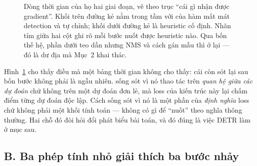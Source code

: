 \documentclass[../../../deep_learning.tex]{subfiles}
\begin{document}
\begin{figure}[H]
{}
\caption{Dòng thời gian của họ hai giai đoạn, vẽ theo trục ``cái gì nhận được gradient''. Khối trên đường kẻ nằm trong tầm với của hàm mất mát detection và tự chỉnh; khối dưới đường kẻ là heuristic cố định. Nhãn tím giữa hai cột ghi rõ mỗi bước nuốt được heuristic nào. Qua bốn thế hệ, phần dưới teo dần nhưng NMS và cách gán mẫu thì ở lại --- đó là dư địa mà Mục~2 khai thác.}
\label{fig:nuot-heuristic}
\end{figure}

Hình~\ref{fig:nuot-heuristic} cho thấy điều mà một bảng thời gian không cho thấy: cái còn sót lại sau bốn bước không phải là ngẫu nhiên.  sống sót vì nó thao tác trên \emph{quan hệ giữa các dự đoán} chứ không trên một dự đoán đơn lẻ, mà loss của kiến trúc này lại chấm điểm từng dự đoán độc lập. Cách  sống sót vì nó là một phần của \emph{định nghĩa} loss chứ không phải một khối tính toán --- không có gì để ``nuốt'' theo nghĩa thông thường. Hai chỗ đó đòi hỏi đổi phát biểu bài toán, và đó đúng là việc DETR làm ở mục sau.

\subsection{B. Ba phép tính nhỏ giải thích ba bước nhảy}
\end{document}
